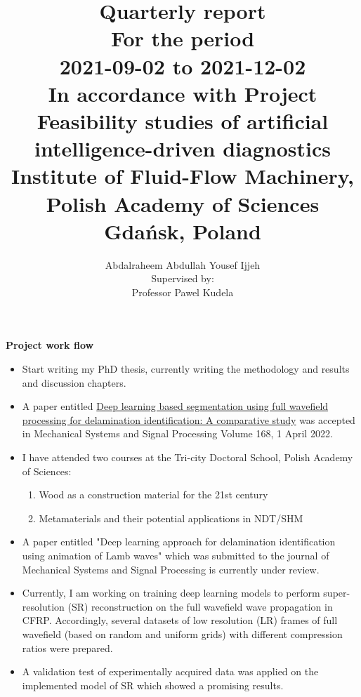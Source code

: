 \documentclass[11pt,a4paper]{report}
\author{Abdalraheem Abdullah Yousef Ijjeh \\
	Supervised by: \\
	Professor Pawel Kudela}
\title{\Huge Quarterly report \\
	\huge For the period \\ 2021-09-02 to 2021-12-02
	\\ \Large In accordance with Project\\
	Feasibility studies of artificial intelligence-driven diagnostics\\ Institute of Fluid-Flow Machinery, Polish Academy of Sciences
	\\ Gdańsk, Poland}
\begin{document}
	\date{}
	\maketitle
	\newpage
	{\huge \textbf{Project work flow}}
	\begin{itemize}
		\item Start writing my PhD thesis, currently writing the methodology and results and discussion chapters.	
		\item A paper entitled \href{https://www.sciencedirect.com/science/article/pii/S0888327021009948}{Deep learning based segmentation using full wavefield processing for delamination identification: A comparative study} was accepted in Mechanical Systems and Signal Processing
		Volume 168, 1 April 2022.
		\item I have attended two courses at the Tri-city Doctoral School, Polish Academy of Sciences:
		\begin{enumerate}
			\item Wood as a construction material for the 21st century
			\item Metamaterials and their potential applications in NDT/SHM		
		\end{enumerate}
		\item A paper entitled "Deep learning approach for delamination identification using animation of Lamb waves" which was submitted to the journal of Mechanical Systems and Signal Processing is currently under review. 
		\item Currently, I am working on training deep learning models to perform super-resolution (SR) reconstruction on the full wavefield wave propagation in CFRP. 
		Accordingly, several datasets of low resolution (LR) frames of full wavefield (based on random and uniform grids) with different compression ratios were prepared.
		\item A validation test of experimentally acquired data was applied on the implemented model of SR which showed a promising results.
		
	\end{itemize}
%	
%	
\end{document}
